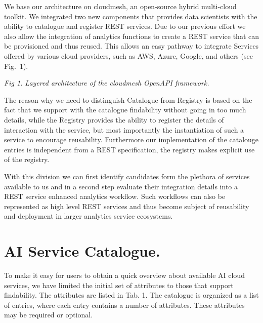 \documentclass[A0,6pt]{article}
\begin{document}
\begin{multicols}{3}
We base our architecture on cloudmesh, an open-source hybrid multi-cloud toolkit. We integrated two new components that provides data scientists with the ability to catalogue and register REST services. Due to our previous effort we also allow the integration of analytics functions to create a REST service that can be provisioned and thus reused. This allows an easy pathway to integrate Services offered by various cloud providers, such as AWS, Azure, Google, and others (see Fig.~1).  

\begin{center}
\end{center}
\vspace{-12pt}
{\em Fig 1. Layered architecture of the cloudmesh Open\-API framework.}

The reason why we need to distinguish Catalogue from Registry is based on the fact that we support with the catalogue findability without going in too much details, while the Registry provides the ability to register the details of interaction with the service, but most importantly the instantiation of such a service to encourage reusability. Furthermore our implementation of the catalouge entries is independent from a REST specification, the registry makes explicit use of the registry. 

With this division we can first identify candidates form the plethora of services available to us and in a second step evaluate their integration details into a REST service enhanced analytics workflow. Such workflows can also be represented as high level REST services and thus become subject of reusability and deployment in larger analytics service ecosystems. 


\section*{AI Service Catalogue.}
To make it easy for users to obtain a quick overview about available AI cloud services, we have limited the initial set of attributes to those that support findability. The attributes are listed in Tab. 1. The catalogue is organized as a list of entries, where each entry contains a number of attributes. These attributes may be required or optional. 


\end{multicols}
\end{document}
